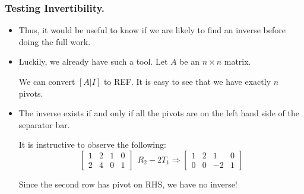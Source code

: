 \begin{frame}%
  \frametitle{Testing Invertibility.}
  \begin{itemize}%
\item Thus, it would be useful to know if we are likely to find an
inverse before doing the full work.

\item Luckily, we already have such a tool. Let $A$ be an $n\times n$
matrix.

We can convert
$\left[A|I\right]$ to REF. It is easy to see that we have exactly $n$
pivots.

\item The inverse exists if and only if all the pivots are on the left
hand side of the separator bar.

It is instructive to observe the following:
$$\left[
\begin{array}{cc|cc}
1 & 2 & 1 & 0\\
2 & 4 & 0 & 1
\end{array}
\right] ~~ R_2-2T_1\Rightarrow
\left[
\begin{array}{cc|cc}
1 & 2 & 1 & 0\\
0 & 0 & -2 & 1
\end{array}
\right]
$$

Since the second row has pivot on RHS, we have no inverse!
\end{itemize}
\end{frame}
